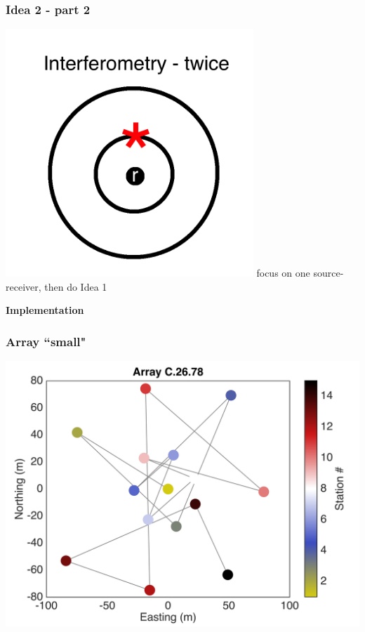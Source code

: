 \documentclass{beamer}
\begin{document}
\frame
{
\frametitle{{\bf Idea 2 - part 2}}
\centering
\includegraphics[width=0.7\textwidth]{../pics/idea/vamos-2.png}
\vfill
focus on one source-receiver, then do Idea 1
}
\frame
{
\centering
{\bf Implementation}
}
\frame
{
\frametitle{{\bf Array ``small"}}
\centering
\includegraphics[width=\textwidth]{../pics/C-26-78/array.png}
}
\end{document}
